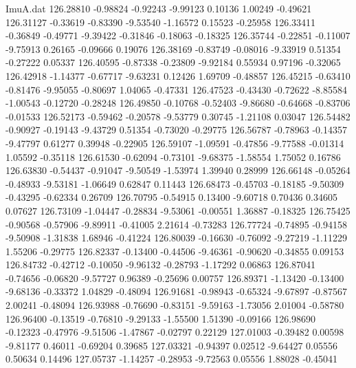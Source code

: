 \begin{filecontents}{ImuA.dat}
 126.28810   -0.98824   -0.92243   -9.99123    0.10136    1.00249   -0.49621
 126.31127   -0.33619   -0.83390   -9.53540   -1.16572    0.15523   -0.25958
 126.33411   -0.36849   -0.49771   -9.39422   -0.31846   -0.18063   -0.18325
 126.35744   -0.22851   -0.11007   -9.75913    0.26165   -0.09666    0.19076
 126.38169   -0.83749   -0.08016   -9.33919    0.51354   -0.27222    0.05337
 126.40595   -0.87338   -0.23809   -9.92184    0.55934    0.97196   -0.32065
 126.42918   -1.14377   -0.67717   -9.63231    0.12426    1.69709   -0.48857
 126.45215   -0.63410   -0.81476   -9.95055   -0.80697    1.04065   -0.47331
 126.47523   -0.43430   -0.72622   -8.85584   -1.00543   -0.12720   -0.28248
 126.49850   -0.10768   -0.52403   -9.86680   -0.64668   -0.83706   -0.01533
 126.52173   -0.59462   -0.20578   -9.53779    0.30745   -1.21108    0.03047
 126.54482   -0.90927   -0.19143   -9.43729    0.51354   -0.73020   -0.29775
 126.56787   -0.78963   -0.14357   -9.47797    0.61277    0.39948   -0.22905
 126.59107   -1.09591   -0.47856   -9.77588   -0.01314    1.05592   -0.35118
 126.61530   -0.62094   -0.73101   -9.68375   -1.58554    1.75052    0.16786
 126.63830   -0.54437   -0.91047   -9.50549   -1.53974    1.39940    0.28999
 126.66148   -0.05264   -0.48933   -9.53181   -1.06649    0.62847    0.11443
 126.68473   -0.45703   -0.18185   -9.50309   -0.43295   -0.62334    0.26709
 126.70795   -0.54915    0.13400   -9.60718    0.70436    0.34605    0.07627
 126.73109   -1.04447   -0.28834   -9.53061   -0.00551    1.36887   -0.18325
 126.75425   -0.90568   -0.57906   -9.89911   -0.41005    2.21614   -0.73283
 126.77724   -0.74895   -0.94158   -9.50908   -1.31838    1.68946   -0.41224
 126.80039   -0.16630   -0.76092   -9.27219   -1.11229    1.55206   -0.29775
 126.82337   -0.13400   -0.44506   -9.46361   -0.90620   -0.34855    0.09153
 126.84732   -0.42712   -0.10050   -9.96132   -0.28793   -1.17292    0.06863
 126.87041   -0.74656   -0.06820   -9.57727    0.96389   -0.25696    0.00757
 126.89371   -1.13420   -0.13400   -9.68136   -0.33372    1.04829   -0.48094
 126.91681   -0.98943   -0.65324   -9.67897   -0.87567    2.00241   -0.48094
 126.93988   -0.76690   -0.83151   -9.59163   -1.73056    2.01004   -0.58780
 126.96400   -0.13519   -0.76810   -9.29133   -1.55500    1.51390   -0.09166
 126.98690   -0.12323   -0.47976   -9.51506   -1.47867   -0.02797    0.22129
 127.01003   -0.39482    0.00598   -9.81177    0.46011   -0.69204    0.39685
 127.03321   -0.94397    0.02512   -9.64427    0.05556    0.50634    0.14496
 127.05737   -1.14257   -0.28953   -9.72563    0.05556    1.88028   -0.45041

\end{filecontents}
